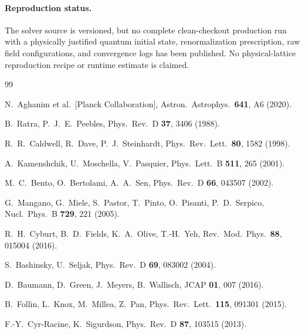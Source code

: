 \documentclass[epj]{svjour}
\begin{document}
\paragraph{Reproduction status.}
The solver source is versioned, but no complete clean-checkout
production run with a physically justified quantum initial state,
renormalization prescription, raw field configurations, and convergence
logs has been published. No physical-lattice reproduction recipe or
runtime estimate is claimed.


\begin{thebibliography}{99}

N.~Aghanim et al.\ [Planck Collaboration],
Astron.\ Astrophys.\ \textbf{641}, A6 (2020).

B.~Ratra, P.~J.~E.~Peebles,
Phys.\ Rev.\ D \textbf{37}, 3406 (1988).

R.~R.~Caldwell, R.~Dave, P.~J.~Steinhardt,
Phys.\ Rev.\ Lett.\ \textbf{80}, 1582 (1998).

A.~Kamenshchik, U.~Moschella, V.~Pasquier,
Phys.\ Lett.\ B \textbf{511}, 265 (2001).

M.~C.~Bento, O.~Bertolami, A.~A.~Sen,
Phys.\ Rev.\ D \textbf{66}, 043507 (2002).

G.~Mangano, G.~Miele, S.~Pastor, T.~Pinto, O.~Pisanti,
P.~D.~Serpico,
Nucl.\ Phys.\ B \textbf{729}, 221 (2005).

R.~H.~Cyburt, B.~D.~Fields, K.~A.~Olive, T.-H.~Yeh,
Rev.\ Mod.\ Phys.\ \textbf{88}, 015004 (2016).

S.~Bashinsky, U.~Seljak,
Phys.\ Rev.\ D \textbf{69}, 083002 (2004).

D.~Baumann, D.~Green, J.~Meyers, B.~Wallisch,
JCAP \textbf{01}, 007 (2016).

B.~Follin, L.~Knox, M.~Millea, Z.~Pan,
Phys.\ Rev.\ Lett.\ \textbf{115}, 091301 (2015).

F.-Y.~Cyr-Racine, K.~Sigurdson,
Phys.\ Rev.\ D \textbf{87}, 103515 (2013).


\end{thebibliography}
\end{document}
